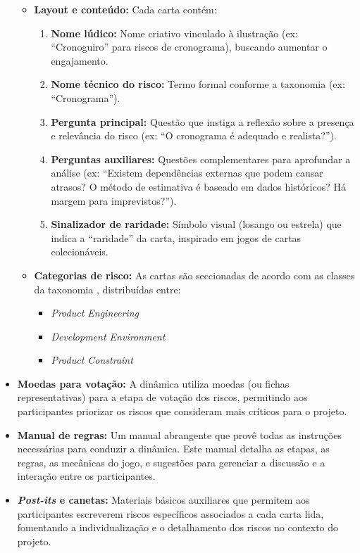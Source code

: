 \documentclass[
	12pt,
	openright,
	twoside,
	a4paper,
	english,
	brazil
	]{abntex2}
\begin{document}
\begin{itemize}
\begin{itemize}
    \item \textbf{Layout e conteúdo:} Cada carta contém:
    \begin{enumerate}
      \item \textbf{Nome lúdico:} Nome criativo vinculado à ilustração (ex: “Cronoguiro” para riscos de cronograma), buscando aumentar o engajamento.
      \item \textbf{Nome técnico do risco:} Termo formal conforme a taxonomia (ex: “Cronograma”).
      \item \textbf{Pergunta principal:} Questão que instiga a reflexão sobre a presença e relevância do risco (ex: “O cronograma é adequado e realista?”).
      \item \textbf{Perguntas auxiliares:} Questões complementares para aprofundar a análise (ex: “Existem dependências externas que podem causar atrasos? O método de estimativa é baseado em dados históricos? Há margem para imprevistos?”).
      \item \textbf{Sinalizador de raridade:} Símbolo visual (losango ou estrela) que indica a “raridade” da carta, inspirado em jogos de cartas colecionáveis.
    \end{enumerate}
    
    \item \textbf{Categorias de risco:} As cartas são seccionadas de acordo com as classes da taxonomia \cite{carr_1993}, distribuídas entre:
    \begin{itemize}
      \item \textit{Product Engineering}
      \item \textit{Development Environment}
      \item \textit{Product Constraint}
    \end{itemize}
  \end{itemize}

  \item \textbf{Moedas para votação:} A dinâmica utiliza moedas (ou fichas representativas) para a etapa de votação dos riscos, permitindo aos participantes priorizar os riscos que consideram mais críticos para o projeto. 

  \item \textbf{Manual de regras:} Um manual abrangente que provê todas as instruções necessárias para conduzir a dinâmica. Este manual detalha as etapas, as regras, as mecânicas do jogo, e sugestões para gerenciar a discussão e a interação entre os participantes. 

  \item \textbf{\textit{Post-its} e canetas:} Materiais básicos auxiliares que permitem aos participantes escreverem riscos específicos associados a cada carta lida, fomentando a individualização e o detalhamento dos riscos no contexto do projeto. 
\end{itemize}
\end{document}
